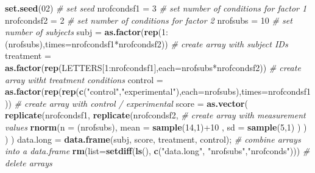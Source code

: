 \documentclass[]{article}
\newenvironment{Shaded}{\begin{snugshade}}{\end{snugshade}}
\newcommand{\KeywordTok}[1]{\textcolor[rgb]{0.13,0.29,0.53}{\textbf{{#1}}}}
\newcommand{\DataTypeTok}[1]{\textcolor[rgb]{0.13,0.29,0.53}{{#1}}}
\newcommand{\DecValTok}[1]{\textcolor[rgb]{0.00,0.00,0.81}{{#1}}}
\newcommand{\StringTok}[1]{\textcolor[rgb]{0.31,0.60,0.02}{{#1}}}
\newcommand{\CommentTok}[1]{\textcolor[rgb]{0.56,0.35,0.01}{\textit{{#1}}}}
\newcommand{\NormalTok}[1]{{#1}}
\begin{document}
\begin{Shaded}
\begin{Highlighting}[]
\KeywordTok{set.seed}\NormalTok{(}\DecValTok{02}\NormalTok{)  }\CommentTok{# set seed}
\NormalTok{nrofcondsf1 =}\StringTok{ }\DecValTok{3}  \CommentTok{# set number of conditions for factor 1}
\NormalTok{nrofcondsf2 =}\StringTok{ }\DecValTok{2}  \CommentTok{# set number of conditions for factor 2}
\NormalTok{nrofsubs    =}\StringTok{ }\DecValTok{10} \CommentTok{# set number of subjects }
\NormalTok{subj =}\StringTok{ }\KeywordTok{as.factor}\NormalTok{(}\KeywordTok{rep}\NormalTok{(}\DecValTok{1}\NormalTok{:(nrofsubs),}\DataTypeTok{times=}\NormalTok{nrofcondsf1*nrofcondsf2))    }\CommentTok{# create array with subject IDs}
\NormalTok{treatment =}\StringTok{ }\KeywordTok{as.factor}\NormalTok{(}\KeywordTok{rep}\NormalTok{(LETTERS[}\DecValTok{1}\NormalTok{:nrofcondsf1],}\DataTypeTok{each=}\NormalTok{nrofsubs*nrofcondsf2))   }\CommentTok{# create array witht treatment conditions}
\NormalTok{control   =}\StringTok{ }\KeywordTok{as.factor}\NormalTok{(}\KeywordTok{rep}\NormalTok{(}\KeywordTok{rep}\NormalTok{(}\KeywordTok{c}\NormalTok{(}\StringTok{"control"}\NormalTok{,}\StringTok{"experimental"}\NormalTok{),}\DataTypeTok{each=}\NormalTok{nrofsubs),}\DataTypeTok{times=}\NormalTok{nrofcondsf1))   }\CommentTok{# create array with control / experimental}
\NormalTok{score =}\StringTok{ }\KeywordTok{as.vector}\NormalTok{( }\KeywordTok{replicate}\NormalTok{(nrofcondsf1, }\KeywordTok{replicate}\NormalTok{(nrofcondsf2,    }\CommentTok{# create array with measurement values}
                             \KeywordTok{rnorm}\NormalTok{(}\DataTypeTok{n =} \NormalTok{(nrofsubs), }\DataTypeTok{mean =} \KeywordTok{sample}\NormalTok{(}\DecValTok{14}\NormalTok{,}\DecValTok{1}\NormalTok{)+}\DecValTok{10} \NormalTok{, }\DataTypeTok{sd =} \KeywordTok{sample}\NormalTok{(}\DecValTok{5}\NormalTok{,}\DecValTok{1}\NormalTok{)                }
                                   \NormalTok{) ) ) )                  }
\NormalTok{data.long =}\StringTok{ }\KeywordTok{data.frame}\NormalTok{(subj, score, treatment, control);      }\CommentTok{# combine arrays into a data.frame}
\KeywordTok{rm}\NormalTok{(}\DataTypeTok{list=}\KeywordTok{setdiff}\NormalTok{(}\KeywordTok{ls}\NormalTok{(), }\KeywordTok{c}\NormalTok{(}\StringTok{"data.long"}\NormalTok{, }\StringTok{"nrofsubs"}\NormalTok{,}\StringTok{"nrofconds"}\NormalTok{))) }\CommentTok{# delete arrays}
\end{Highlighting}
\end{Shaded}
\end{document}
